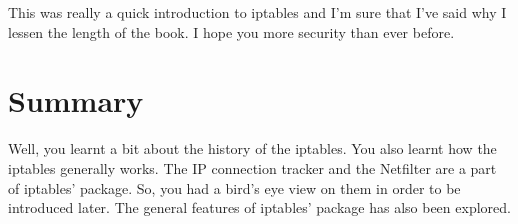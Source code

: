 This was really a quick introduction to iptables and I'm sure that I've said why I lessen the length of the book. I hope you more security than ever before.\newline
\section{Summary}
Well, you learnt a bit about the history of the iptables. You also learnt how the iptables generally works. The IP connection tracker and the Netfilter are a part of iptables' package. So, you had a bird's eye view on them in order to be introduced later. The general features of iptables' package has also been explored.